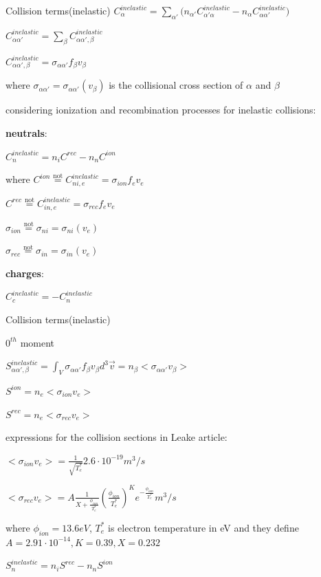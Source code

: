\documentclass{beamer}
\begin{document}
\begin{frame}{Collision terms(inelastic) }
$C_{\alpha}^{inelastic} = \sum_{\alpha'} {(n_{\alpha'} C_{\alpha'\alpha}^{inelastic} - n_{\alpha} C_{\alpha\alpha'}^{inelastic}}) $

$C_{\alpha\alpha'}^{inelastic} =  \sum_{\beta} {C_{\alpha\alpha',\beta}^{inelastic}  }$

$C_{\alpha\alpha',\beta}^{inelastic} =  \sigma_{\alpha \alpha'} f_{\beta} v_{\beta} $  

where $\sigma_{\alpha \alpha'} = \sigma_{\alpha \alpha'}(v_{\beta}) $  is the collisional cross section of $\alpha$ and $\beta$ 

considering ionization and recombination processes for inelastic collisions:

\textbf{neutrals}:

$C_n^{inelastic} = n_i C^{rec} - n_n C^{ion}$ 

where $C^{ion} \stackrel{\text{not}}{=} C_{ni,e}^{inelastic} = \sigma_{ion} f_e v_e$

$C^{rec} \stackrel{\text{not}}{=} C_{in,e}^{inelastic} = \sigma_{rec} f_e v_e $

$\sigma_{ion}  \stackrel{\text{not}}{=}  \sigma_{ni}= \sigma_{ni} (v_e) $

$\sigma_{rec}  \stackrel{\text{not}}{=}   \sigma_{in}= \sigma_{in} (v_e) $

\textbf{charges}:

$C_c^{inelastic} = -C_n^{inelastic}$ 

\end{frame}


\begin{frame}{Collision terms(inelastic) }

{\color{red} $0^{th}$ moment}

$S_{\alpha\alpha',\beta}^{inelastic} = \int_V{\sigma_{\alpha \alpha'} f_{\beta} v_{\beta} d^3\vec{v} } = n_{\beta} <\sigma_{\alpha \alpha'} v_{\beta} >$  


$S^{ion} = n_e <\sigma_{ion} v_e >$ 

$S^{rec} = n_e <\sigma_{rec} v_e >$


expressions for the collision sections in Leake article:

$<\sigma_{ion} v_e > = \frac{1}{\sqrt{T_e^*}}	2.6 \cdot 10^{-19} m^3/s$

$<\sigma_{rec} v_e > = A \frac{1}{X + \frac{\phi_{ion}}{T_e^*}}	(\frac{\phi_{ion}}{T_e^*})^K  e^{-\frac{\phi_{ion}}{T_e^*} } m^3/s$

where $\phi_{ion} = 13.6 eV$, $T_e^*$ is electron temperature in eV and  they define $A = 2.91 \cdot 10^{-14}, K = 0.39, X = 0.232$


$S_n^{inelastic} = n_i S^{rec} - n_n S^{ion}  $ 




\end{frame}
\end{document}
